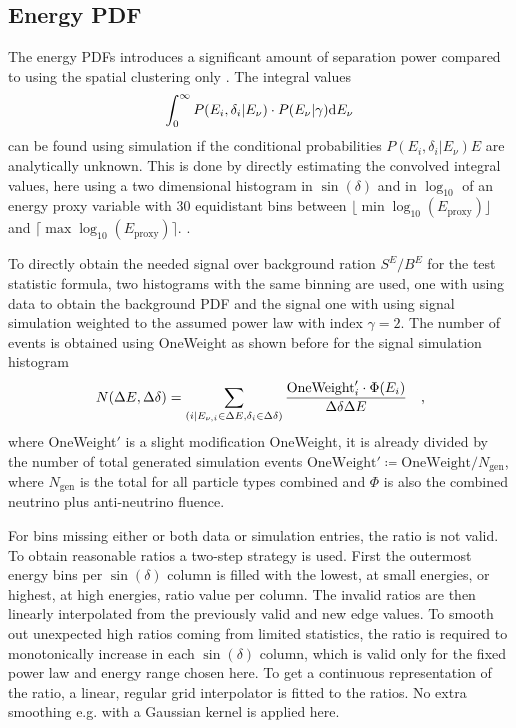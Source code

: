 \subsection*{Energy PDF}
The energy PDFs introduces a significant amount of separation power compared to using the spatial clustering only .
The integral values
\begin{equation}
  \int_0^\infty P(E_i,\delta_i|E_\nu)\cdot P(E_\nu|\gamma) \mathrm{d}E_\nu
\end{equation}
can be found using simulation if the conditional probabilities $P(E_i,\delta_i|E_\nu)E$ are analytically unknown.
This is done by directly estimating the convolved integral values, here using a two dimensional histogram in $\sin(\delta)$ and in $\log_{10}$ of an energy proxy variable with $\num{30}$ equidistant bins between $\lfloor \min\log_{10}(E_\text{proxy}) \rfloor$ and $\lceil \max\log_{10}(E_\text{proxy}) \rceil$.
.

To directly obtain the needed signal over background ration $S^E / B^E$ for the test statistic formula, two histograms with the same binning are used, one with using data to obtain the background PDF and the signal one with using signal simulation weighted to the assumed power law with index $\gamma = 2$.
The number of events is obtained using OneWeight as shown before for the signal simulation histogram
\begin{equation}
  N(\Delta E, \Delta\delta)
  = \sum_{(i|E_{\nu,i}\in\Delta E, \delta_i\in\Delta\delta)}
    \frac{\text{OneWeight}'_i \cdot \Phi(E_i)}{\Delta\delta \Delta E}
  \quad\text{,}
\end{equation}
where OneWeight$'$ is a slight modification OneWeight, it is already divided by the number of total generated simulation events $\text{OneWeight}'\coloneqq\text{OneWeight}/N_\text{gen}$, where $N_\text{gen}$ is the total for all particle types combined and $\Phi$ is also the combined neutrino plus anti-neutrino fluence.

For bins missing either or both data or simulation entries, the ratio is not valid.
To obtain reasonable ratios a two-step strategy is used.
First the outermost energy bins per $\sin(\delta)$ column is filled with the lowest, at small energies, or highest, at high energies, ratio value per column.
The invalid ratios are then linearly interpolated from the previously valid and new edge values.
To smooth out unexpected high ratios coming from limited statistics, the ratio is required to monotonically increase in each $\sin(\delta)$ column, which is valid only for the fixed power law and energy range chosen here.
To get a continuous representation of the ratio, a linear, regular grid interpolator is fitted to the ratios.
No extra smoothing e.g. with a Gaussian kernel is applied here.

